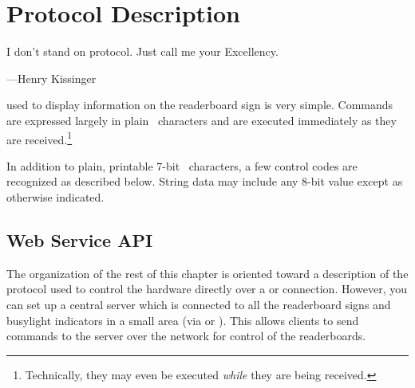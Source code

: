\chapter{Protocol Description}\label{chap:protocol}
{\setlength{\epigraphwidth}{.5\textwidth}
\epigraph{I don't stand on protocol. Just call me your Excellency.}{---Henry Kissinger}}
 used to display information on the readerboard sign is very simple.
Commands are expressed largely in plain \ascii\ characters and are executed immediately
as they are received.\footnote{Technically, they may even be executed \emph{while} they
are being received.}

In addition to plain, printable 7-bit \ascii\ characters, a few control codes are
recognized as described below. String data may include any 8-bit value except as otherwise
indicated.

%
%
%
\section{Web Service API}
The organization of the rest of this chapter is oriented toward a description of the
protocol used to control the hardware directly over a  or 
connection. However, you can set up a central server which is connected to all the
readerboard signs and busylight indicators in a small area (via  or ).
This allows clients to send commands to the server over the network for control of the readerboards.

